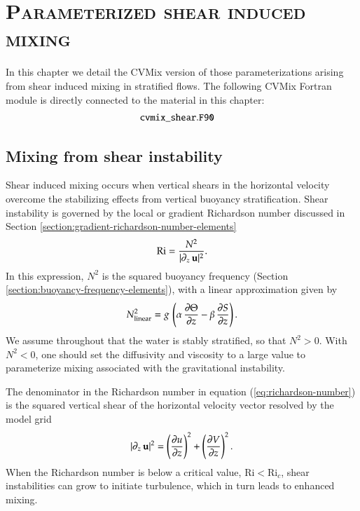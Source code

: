 \chapter{\scshape Parameterized shear induced mixing}
\label{chapter:cvmix_shear}

\minitoc
\vspace{.5cm}

\begin{mdframed}[backgroundcolor=lightgray!50]
  In this chapter we detail the CVMix version of those
  parameterizations arising from shear induced mixing in stratified
  flows.  The following CVMix Fortran module is directly connected to
  the material in this chapter:
\begin{align*} 
 &{\tt cvmix\_shear.F90}
\end{align*}
\end{mdframed}

\section{Mixing from shear instability}
\label{section:shear-instability-mixing}

Shear induced mixing occurs when vertical shears in the horizontal
velocity overcome the stabilizing effects from vertical buoyancy
stratification.  Shear instability is governed by the local or
gradient Richardson number discussed in Section
\ref{section:gradient-richardson-number-elements}
\begin{equation}
 \mbox{Ri} = \frac{N^{2}}{|\partial_{z} \, {\bf u}|^{2} }.
\label{eq:richardson-number}
\end{equation}
In this expression, $N^{2}$ is the squared buoyancy frequency (Section
\ref{section:buoyancy-frequency-elements}), with a linear
approximation given by
\begin{equation}
 N^{2}_{\mbox{\scriptsize linear}} 
 = g \, \left( \alpha \, \frac{\partial \Theta}{\partial z} 
                         - \beta  \, \frac{\partial S}{\partial z} \right).
\label{eq:buoyancy-frequency-shear}
\end{equation}
We assume throughout that the water is stably stratified, so that
$N^{2} > 0$.  With $N^{2} < 0$, one should set the diffusivity and
viscosity to a large value to parameterize mixing associated with the
gravitational instability.

The denominator in the Richardson number in equation
(\ref{eq:richardson-number}) is the squared vertical shear of the
horizontal velocity vector resolved by the model grid
\begin{equation}
 |\partial_{z} \, {\bf u}|^{2}  =
  \left( \frac{\partial u}{\partial z} \right)^{2} 
 +
 \left( \frac{\partial V}{\partial z} \right)^{2}. 
\end{equation}
When the Richardson number is below a critical value, $\mbox{Ri} <
\mbox{Ri}_{c}$, shear instabilities can grow to initiate turbulence,
which in turn leads to enhanced mixing.

